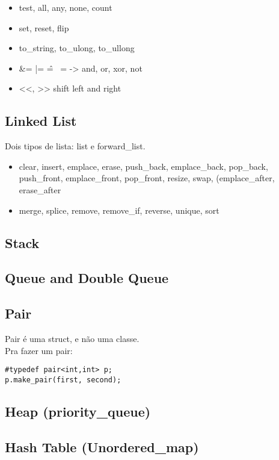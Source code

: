 \documentclass{article}
\begin{document}
\begin{itemize}
   \item test, all, any, none, count
   \item set, reset, flip
   \item to\_string, to\_ulong, to\_ullong
   \item \&= |= \^= ~= -> and, or, xor, not
   \item <<, >> shift left and right
\end{itemize}

\subsection{Linked List}
Dois tipos de lista: list e forward\_list.

\begin{itemize}
   \item clear, insert, emplace, erase, push\_back, emplace\_back, pop\_back, push\_front, emplace\_front, pop\_front, resize, swap, (emplace\_after, erase\_after
   \item merge, splice, remove, remove\_if, reverse, unique, sort
\end{itemize}

\subsection{Stack}


\subsection{Queue and Double Queue}

\subsection{Pair}
Pair é uma struct, e não uma classe.\\
Pra fazer um pair:
\begin{lstlisting}
#typedef pair<int,int> p;
p.make_pair(first, second);
\end{lstlisting}


\subsection{Heap (priority\_queue)}

\subsection{Hash Table (Unordered\_map)}
\end{document}
